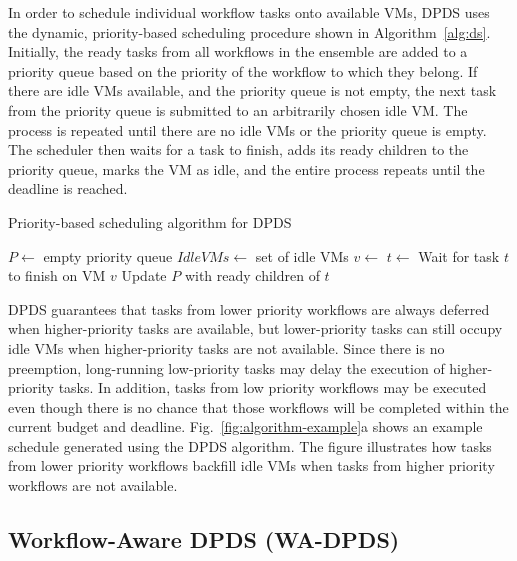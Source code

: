 \documentclass[conference]{IEEEtran}
\begin{document}
In order to schedule individual workflow tasks onto available VMs, DPDS uses the
dynamic, priority-based scheduling procedure shown in Algorithm~\ref{alg:ds}.
Initially, the ready tasks from all workflows in the ensemble are added to a
priority queue based on the priority of the workflow to which they belong. If
there are idle VMs available, and the priority queue is not empty, the next task
from the priority queue is submitted to an arbitrarily chosen idle VM. The
process is repeated until there are no idle VMs or the priority queue is empty.
The scheduler then waits for a task to finish, adds its ready children to the
priority queue, marks the VM as idle, and the entire process repeats until the
deadline is reached.

\begin{algorithm}[tb]
\caption{Priority-based scheduling algorithm for DPDS}
\label{alg:ds}
{\footnotesize
\begin{algorithmic}[1]
    \State $P\gets$ empty priority queue
  \State $IdleVMs\gets$ set of idle VMs
      \State {} 
    \EndFor
        \State $v\gets$ 
        \State $t\gets$ 
        \State {}
      \EndWhile
      \State Wait for task $t$ to finish on VM $v$
      \State Update $P$ with ready children of $t$
    \State {}
    \EndWhile
\EndProcedure
\end{algorithmic}
}
\end{algorithm}


DPDS guarantees that tasks from lower priority workflows are
always deferred when higher-priority tasks are available, but lower-priority
tasks can still occupy idle VMs when higher-priority tasks are not available.
Since there is no preemption, long-running low-priority tasks may
delay the execution of higher-priority tasks. In addition, tasks from low
priority workflows may be executed even though there is no chance that those
workflows will be completed within the current budget and deadline.
Fig.~\ref{fig:algorithm-example}a shows an example schedule generated using
the DPDS algorithm. The figure illustrates how tasks from lower priority workflows
backfill idle VMs when tasks from higher priority workflows are not available.


\subsection{Workflow-Aware DPDS (WA-DPDS)}
\end{document}
